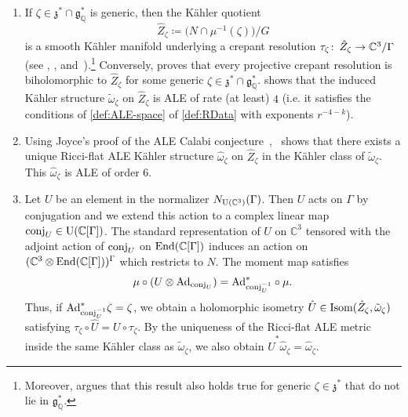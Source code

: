 \documentclass[11pt,a4paper]{scrartcl}
\newcommand{\col}{\colon \thinspace}
\newcommand{\End}{\textup{End}}
\newcommand{\Ad}{\textup{Ad}}
\newcommand{\U}{\textup{U}}
\numberwithin{equation}{section}
\theoremstyle{plain}
\theoremstyle{definition}
\theoremstyle{remark}
\begin{document}
\begin{enumerate}
\item \label{bul:ALE-Crepant-Resolutions-via-KählerQuotients} If $\zeta \in \mathfrak{z}^*\cap \mathfrak{g}^*_\mathbb{Q}$ is generic, then the Kähler quotient \[\hat{Z}_\zeta \coloneqq \big(N \cap \mu^{-1}(\zeta)\big) /G \] is a smooth Kähler manifold underlying a crepant resolution $\tau_\zeta \col \hat{Z}_\zeta \to \mathbb{C}^3/\Gamma$ (see \cite[Theorem~1.1]{BridegelandKingReid--Mukai_McKay}, \cite[Theorem~2.5]{CrawIshii-Flops}, and~\cite[Proposition~3.6]{WalpuskiDegeratu-HYM_on_crepant_resolutions}).\footnote{Moreover, \cite[Section~2.1]{Yamagishi--Craw_Ishii_conjecture} argues that this result also holds true for generic $\zeta \in \mathfrak{z}^*$ that do not lie in $\mathfrak{g}_\mathbb{Q}^*$.} Conversely, \cite[Theorem~1.1]{CrawIshii-Flops} proves that every projective crepant resolution is biholomorphic to $\hat{Z}_\zeta$ for some generic $\zeta\in \mathfrak{z}^*\cap \mathfrak{g}^*_\mathbb{Q}$. \cite[Theorem~5.1]{Sardo-Infirri-ParitalResolutions} shows that the induced Kähler structure $\tilde{\omega}_\zeta$ on $\hat{Z}_\zeta$ is ALE of rate (at least) $4$ (i.e. it satisfies the conditions of \autoref{def:ALE-space} of \autoref{def:RData} with exponents $r^{-4-k}$).

\item Using Joyce's proof of the ALE Calabi conjecture~\cite[Theorem~8.2.3]{Joyce-Black},~\cite[Theorem~4.1]{WalpuskiDegeratu-HYM_on_crepant_resolutions} shows that there exists a unique Ricci-flat ALE Kähler structure $\hat{\omega}_\zeta$ on $\hat{Z}_\zeta$ in the Kähler class of $\tilde{\omega}_\zeta$. This $\hat{\omega}_\zeta$ is ALE of order $6$.

\item \label{bul: lifting group actions to resolution} Let $U$ be an element in the normalizer $N_{\U(\mathbb{C}^3)}(\Gamma)$. Then $U$ acts on $\Gamma$ by conjugation and we extend this action to a complex linear map $\textup{conj}_{U} \in \U(\mathbb{C}[\Gamma])$. The standard representation of $U$ on $\mathbb{C}^3$ tensored with the adjoint action of $\textup{conj}_{U}$ on $\End(\mathbb{C}[\Gamma])$ induces an action on $(\mathbb{C}^3 \otimes \End(\mathbb{C}[\Gamma]))^\Gamma$ which restricts to $N$. The moment map satisfies \[ \mu \circ (U \otimes \Ad_{\textup{conj}_{U}}) = \Ad_{\textup{conj}_{U}^{-1}}^* \circ \mu. \] Thus, if $\Ad^*_{\textup{conj}_{U}^{-1}} \zeta = \zeta$, we obtain a holomorphic isometry $\hat{U} \in \textup{Isom}(\hat{Z}_\zeta,\tilde{\omega}_\zeta)$ satisfying $\tau_\zeta \circ \hat{U} = U \circ \tau_\zeta$. By the uniqueness of the Ricci-flat ALE metric inside the same Kähler class as $\tilde{\omega}_\zeta$, we also obtain $\hat{U}^*\hat{\omega}_\zeta = \hat{\omega}_\zeta$.
\end{enumerate}
\end{document}
